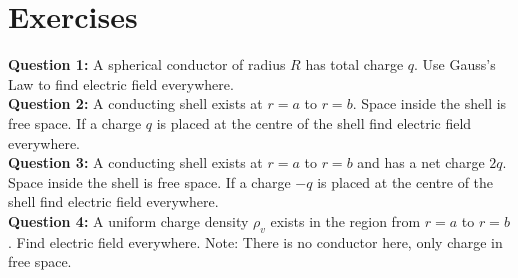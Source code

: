 \documentclass[12pt,a4paper]{article}
\begin{document}
\section{Exercises}
\noindent\textbf{Question 1:} A spherical conductor of radius $R$ has total charge $q$. Use Gauss's Law to find electric field everywhere.\\[0.2cm]
\noindent\textbf{Question 2:} A conducting shell exists at $r=a$ to $r=b$. Space inside the shell is free space. If a charge $q$ is placed at the centre of the shell find electric field everywhere.\\[0.2cm]
\noindent\textbf{Question 3:} A conducting shell exists at $r=a$ to $r=b$ and has a net charge $2q$. Space inside the shell is free space. If a charge $-q$ is placed at the centre of the shell find electric field everywhere.\\[0.2cm]
\noindent\textbf{Question 4:} A uniform charge density $\rho_v$ exists in the region from $r=a$ to $r=b$. Find electric field everywhere. Note: There is no conductor here, only charge in free space.\\[0.2cm]
%
%
\end{document}
